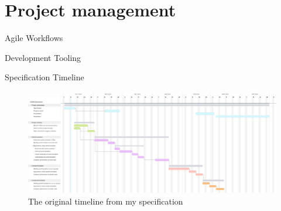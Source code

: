 \documentclass[10pt,aspectratio=169]{beamer}
\begin{document}
\section{Project management}

\begin{frame}{Agile Workflows}

\end{frame}

\begin{frame}{Development Tooling}
\end{frame}

\begin{frame}{Specification Timeline}
    \begin{figure}[h]
        \centering
        \includegraphics[width=\textwidth]{images/specification_gantt_chart.png}
        \caption{The original timeline from my specification}
        \label{fig:specification_gantt_chart}
    \end{figure}
\end{frame}
\end{document}

